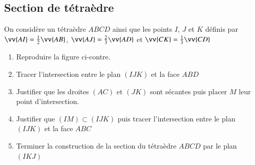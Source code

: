 \documentclass[oneside,12pt]{article}          %
\begin{document}
\subsection{Section de tétraèdre}
\begin{minipage}{0.65\linewidth}
On considère un tétraèdre $ABCD$ ainsi que les points $I$, $J$ et $K$ définis par $\vv{AI}=\frac{1}{2}\vv{AB}$, $\vv{AJ}=\frac{2}{3}\vv{AD}$ et $\vv{CK}=\frac{1}{3}\vv{CD}$\\
\begin{enumerate}
	\item Reproduire la figure ci-contre.
	\item Tracer l'intersection entre le plan $(IJK)$ et la face $ABD$
	\item Justifier que les droites $(AC)$ et $(JK)$ sont sécantes puis placer $M$ leur point d'intersection.
	\item Justifier que $(IM)\subset(IJK)$ puis tracer l'intersection entre le plan $(IJK)$ et la face $ABC$
	\item Terminer la construction de la section du tétraèdre $ABCD$ par le plan $(IKJ)$
\end{enumerate}
\end{minipage}\hfill
\begin{minipage}{0.3\linewidth}
\end{minipage}
\end{document}
